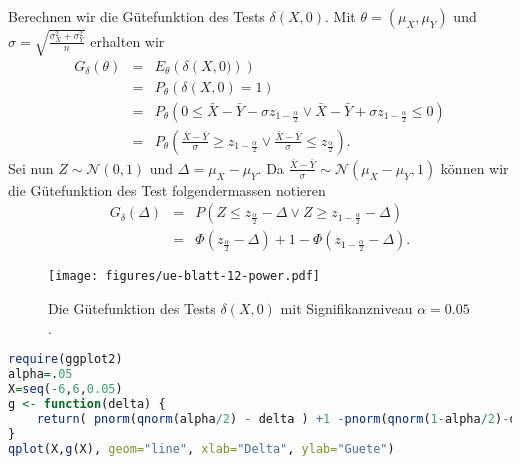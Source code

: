 Berechnen wir die Gütefunktion des Tests $\delta\left( X,0 \right)$. Mit $\theta=\left( \mu_X,\mu_Y \right)$
und $\sigma= \sqrt{\frac{\sigma_X^2 + \sigma_Y^2}{n}}$ erhalten wir
\begin{eqnarray}
    G_\delta(\theta) &=&  E_\theta \left( \delta \left( X,0) \right)  \right) \\
    &=& P_\theta \left( \delta(X,0) = 1 \right) \\
    &=& P_\theta \left( 0 \leq \bar X - \bar Y - \sigma z_{1-\frac{\alpha}{2}} \vee
        \bar X - \bar Y + \sigma z_{1-\frac{\alpha}{2}} \leq 0\right) \\
    &=& P_\theta \left( \frac{\bar X - \bar Y}{\sigma} \geq z_{1-\frac{\alpha}{2}} \vee
    \frac{\bar X - \bar Y}{\sigma} \leq z_{\frac{\alpha}{2}}\right).
\end{eqnarray}
Sei nun $Z\sim\mathcal N(0,1)$ und $\Delta=\mu_X - \mu_Y$. 
Da $\frac{\bar X -\bar Y}{\sigma}\sim \mathcal N(\mu_X-\mu_Y,1)$ können wir die Gütefunktion des 
Test folgendermassen notieren
\begin{eqnarray}
    G_\delta (\Delta) &=& P \left( Z \leq z_{\frac{\alpha}{2}} -\Delta \vee
    Z \geq z_{1-\frac{\alpha}{2}} -\Delta \right)  \\
    &=& \Phi\left( z_{\frac{\alpha}{2}} - \Delta\right) 
    + 1 - \Phi\left( z_{1-\frac{\alpha}{2}} -\Delta \right). 
\end{eqnarray}


\begin{figure}[htb]
    \begin{center}
        \texttt{[image: figures/ue-blatt-12-power.pdf]}
    \end{center}
    \caption{Die Gütefunktion des Tests $\delta(X,0)$ mit Signifikanzniveau $\alpha=0.05$.}
    \label{fig:power}
\end{figure}


\begin{lstlisting}[language=R,caption={R Code zum Plotten der Gütefunktion}]
require(ggplot2)
alpha=.05
X=seq(-6,6,0.05)
g <- function(delta) {
    return( pnorm(qnorm(alpha/2) - delta ) +1 -pnorm(qnorm(1-alpha/2)-delta))  
}
qplot(X,g(X), geom="line", xlab="Delta", ylab="Guete")
\end{lstlisting}







